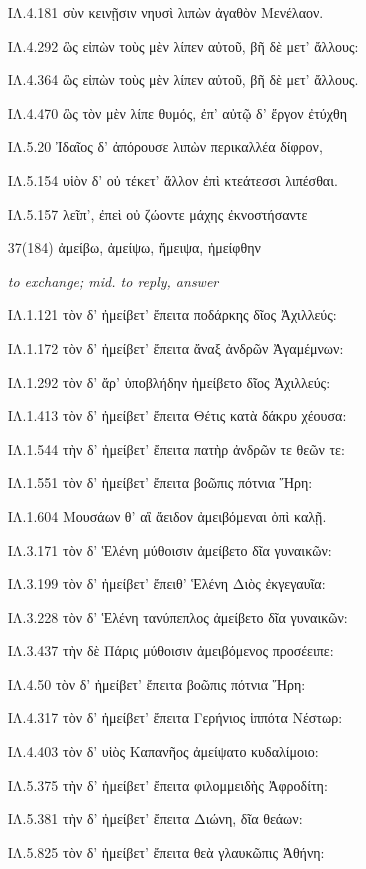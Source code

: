 \begin{enumerate}
{ΙΛ.4.181 σὺν κεινῇσιν νηυσὶ λιπὼν ἀγαθὸν Μενέλαον.

ΙΛ.4.292 ὣς εἰπὼν τοὺς μὲν λίπεν αὐτοῦ, βῆ δὲ μετ' ἄλλους:

ΙΛ.4.364 ὣς εἰπὼν τοὺς μὲν λίπεν αὐτοῦ, βῆ δὲ μετ' ἄλλους.

ΙΛ.4.470 ὣς τὸν μὲν λίπε θυμός, ἐπ' αὐτῷ δ' ἔργον ἐτύχθη

ΙΛ.5.20 Ἰδαῖος δ' ἀπόρουσε λιπὼν περικαλλέα δίφρον,

ΙΛ.5.154 υἱὸν δ' οὐ τέκετ' ἄλλον ἐπὶ κτεάτεσσι λιπέσθαι.

ΙΛ.5.157 λεῖπ', ἐπεὶ οὐ ζώοντε μάχης ἐκνοστήσαντε

}


\clearpage
\item[\large 37(184)]{\large \g ἀμείβω, ἀμείψω, ἤμειψα, ἠμείφθην }

\hspace{0.2cm} \textit{to exchange; mid. to reply, answer }

{\g
ΙΛ.1.121 τὸν δ' ἠμείβετ' ἔπειτα ποδάρκης δῖος Ἀχιλλεύς:

ΙΛ.1.172 τὸν δ' ἠμείβετ' ἔπειτα ἄναξ ἀνδρῶν Ἀγαμέμνων:

ΙΛ.1.292 τὸν δ' ἄρ' ὑποβλήδην ἠμείβετο δῖος Ἀχιλλεύς:

ΙΛ.1.413 τὸν δ' ἠμείβετ' ἔπειτα Θέτις κατὰ δάκρυ χέουσα:

ΙΛ.1.544 τὴν δ' ἠμείβετ' ἔπειτα πατὴρ ἀνδρῶν τε θεῶν τε:

ΙΛ.1.551 τὸν δ' ἠμείβετ' ἔπειτα βοῶπις πότνια Ἥρη:

ΙΛ.1.604 Μουσάων θ' αἳ ἄειδον ἀμειβόμεναι ὀπὶ καλῇ.

ΙΛ.3.171 τὸν δ' Ἑλένη μύθοισιν ἀμείβετο δῖα γυναικῶν:

ΙΛ.3.199 τὸν δ' ἠμείβετ' ἔπειθ' Ἑλένη Διὸς ἐκγεγαυῖα:

ΙΛ.3.228 τὸν δ' Ἑλένη τανύπεπλος ἀμείβετο δῖα γυναικῶν:

ΙΛ.3.437 τὴν δὲ Πάρις μύθοισιν ἀμειβόμενος προσέειπε:

ΙΛ.4.50 τὸν δ' ἠμείβετ' ἔπειτα βοῶπις πότνια Ἥρη:

ΙΛ.4.317 τὸν δ' ἠμείβετ' ἔπειτα Γερήνιος ἱππότα Νέστωρ:

ΙΛ.4.403 τὸν δ' υἱὸς Καπανῆος ἀμείψατο κυδαλίμοιο:

ΙΛ.5.375 τὴν δ' ἠμείβετ' ἔπειτα φιλομμειδὴς Ἀφροδίτη:

ΙΛ.5.381 τὴν δ' ἠμείβετ' ἔπειτα Διώνη, δῖα θεάων:

ΙΛ.5.825 τὸν δ' ἠμείβετ' ἔπειτα θεὰ γλαυκῶπις Ἀθήνη:

}
\end{enumerate}
